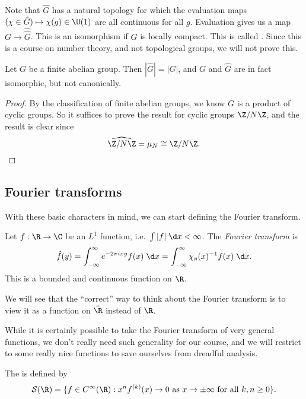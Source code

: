 \documentclass[a4paper]{article}
\begin{document}
Note that $\hat{G}$ has a natural topology for which the evaluation maps $(\chi \in \hat{G}) \mapsto \chi(g) \in \U(1)$ are all continuous for all $g$. Evaluation gives us a map $G \to \hat{\hat{G}}$. This is an isomorphism if $G$ is locally compact. This is called . Since this is a course on number theory, and not topological groups, we will not prove this.

\begin{prop}
  Let $G$ be a finite abelian group. Then $|\hat{G}| = |G|$, and $G$ and $\hat{G}$ are in fact isomorphic, but not canonically.
\end{prop}

\begin{proof}
  By the classification of finite abelian groups, we know $G$ is a product of cyclic groups. So it suffices to prove the result for cyclic groups $\Z/N\Z$, and the result is clear since
  \[
    \widehat{\Z/N\Z} = \mu_N \cong \Z/N\Z.
  \]
\end{proof}

\subsection{Fourier transforms}
With these basic characters in mind, we can start defining the Fourier transform.
\begin{defi}
  Let $f: \R \to \C$ be an $L^1$ function, i.e.\ $\int |f| \;\d x < \infty$. The \emph{Fourier transform} is
  \[
    \hat{f}(y) = \int_{-\infty}^\infty e^{-2\pi i xy} f(x) \;\d x = \int_{-\infty}^\infty \chi_y(x)^{-1} f(x) \;\d x.
  \]
  This is a bounded and continuous function on $\R$.
\end{defi}
We will see that the ``correct'' way to think about the Fourier transform is to view it as a function on $\hat{\R}$ instead of $\R$.

While it is certainly possible to take the Fourier transform of very general functions, we don't really need such generality for our course, and we will restrict to some really nice functions to save ourselves from dreadful analysis.
\begin{defi}
  The  is defined by
  \[
    \mathcal{S}(\R) = \{f \in C^\infty(\R) : x^n f^{(k)}(x) \to 0\text{ as }x \to \pm\infty\text{ for all }k, n\geq 0\}.
  \]
\end{defi}
\end{document}

